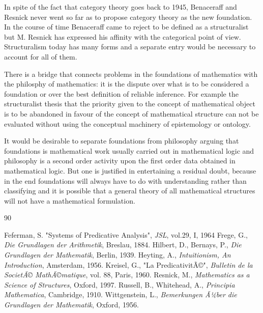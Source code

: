 \documentclass[12pt]{article}
\begin{document}
In spite of the fact that category theory goes back to 1945, Benaceraff and Resnick never went so far as to propose category theory as the new foundation. In the course of time Benaceraff came to reject to be defined as a structuralist but M. Resnick has expressed his affinity with the categorical point of view. Structuralism today has many forms and a separate entry would be necessary to account for all of them. 

There is a bridge that connects problems in the foundations of mathematics with the philosphy of mathematics: it is the dispute over what is to be considered a foundation or over the best definition of reliable inference. For example the structuralist thesis that the priority given to the concept of mathematical object is to be abandoned in favour of the concept of mathematical structure can not be evaluated without using the conceptual machinery of epistemology or ontology. 

It would be desirable to separate foundations from philosophy arguing that foundations is mathematical work usually carried out in mathematical logic and philosophy is a second order activity upon the first order data obtained in mathematical logic. But one is justified in entertaining a residual doubt, because in the end foundations will always have to do with understanding rather than classifying and it is possible that a general theory of all mathematical structures will not have a mathematical formulation.

\vspace{2mm}
\begin{thebibliography} {90}

 Feferman, S. "Systems of Predicative Analysis", \emph{JSL}, vol.29, I, 1964 
 Frege, G., \emph{Die Grundlagen der Arithmetik}, Breslau, 1884.
 Hilbert, D., Bernays, P., \emph{Die Grundlagen der Mathematik}, Berlin, 1939. 
 Heyting, A., \emph{Intuitionism, An Introduction}, Amsterdam, 1956. 
 Kreisel, G., "La PredicativitÃ©", \emph{Bulletin de la SocietÃ© MathÃ©matique}, vol. 88, Paris, 1960.
 Resnick, M., \emph{Mathematics as a Science of Structures}, Oxford, 1997. 
 Russell, B., Whitehead, A., \emph{Principia Mathematica}, Cambridge, 1910. 
 Wittgenstein, L., \emph{Bemerkungen Ã¼ber die Grundlagen der Mathematik}, Oxford, 1956.
\end{thebibliography}
\end{document}
